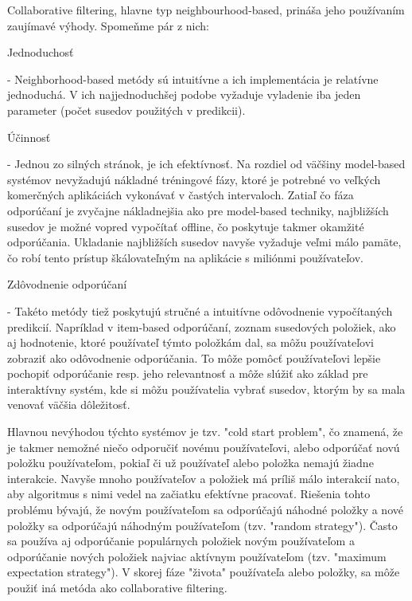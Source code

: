 Collaborative filtering, hlavne typ neighbourhood-based, prináša jeho používaním zaujímavé výhody. Spomeňme pár z nich:
\begin{itemize}[leftmargin=*]
	{\bf \item Jednoduchosť} - Neighborhood-based metódy sú intuitívne a ich implementácia je relatívne jednoduchá. V ich najjednoduchšej podobe vyžaduje vyladenie iba jeden parameter (počet susedov použitých v predikcii).
	{\bf \item Účinnosť} - Jednou zo silných stránok, je ich efektívnosť. Na rozdiel od väčšiny model-based systémov nevyžadujú nákladné tréningové fázy, ktoré je potrebné vo veľkých komerčných aplikáciách vykonávať v častých intervaloch. Zatiaľ čo fáza odporúčaní je zvyčajne nákladnejšia ako pre model-based techniky, najbližších susedov je možné vopred vypočítať offline, čo poskytuje takmer okamžité odporúčania. Ukladanie najbližších susedov navyše vyžaduje veľmi málo pamäte, čo robí tento prístup škálovateľným na aplikácie s miliónmi používateľov.
	{\bf \item Zdôvodnenie odporúčaní} - Takéto metódy tiež poskytujú stručné a intuitívne odôvodnenie vypočítaných predikcií. Napríklad v item-based odporúčaní, zoznam susedových položiek, ako aj hodnotenie, ktoré používateľ týmto položkám dal, sa môžu používateľovi zobraziť ako odôvodnenie odporúčania. To môže pomôcť používateľovi lepšie pochopiť odporúčanie resp. jeho relevantnosť a môže slúžiť ako základ pre interaktívny systém, kde si môžu používatelia vybrať susedov, ktorým by sa mala venovať väčšia dôležitosť.
\end{itemize}


Hlavnou nevýhodou týchto systémov je tzv. "cold start problem", čo znamená, že je takmer nemožné niečo odporučiť novému používateľovi, alebo odporúčať novú položku používateľom, pokiaľ či už používateľ alebo položka nemajú žiadne interakcie. Navyše mnoho používateľov a položiek má príliš málo interakcií nato, aby algoritmus s nimi vedel na začiatku efektívne pracovať. Riešenia tohto problému bývajú, že novým používateľom sa odporúčajú náhodné položky a nové položky sa odporúčajú náhodným používateľom (tzv. "random strategy"). Často sa používa aj odporúčanie populárnych položiek novým používateľom a odporúčanie nových položiek najviac aktívnym používateľom (tzv. "maximum expectation strategy"). V skorej fáze "života" používateľa alebo položky, sa môže použiť iná metóda ako collaborative filtering. \\
	
 
